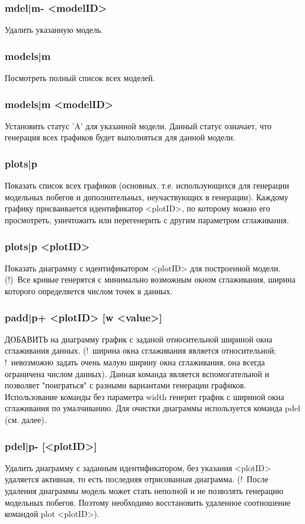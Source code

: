 \documentclass[a4paper]{article}
\begin{document}
\subsubsection{mdel|m- <modelID>}
Удалить указанную модель.

\subsubsection{models|m}
Посмотреть полный список всех моделей.

\subsubsection{models|m <modelID>}
Установить статус 'A' для указанной модели. Данный статус означает, что генерация всех графиков будет выполняться для данной модели.

\subsubsection{plots|p}
Показать список всех графиков (основных, т.е. использующихся для генерации модельных побегов и дополнительных, неучаствующих в генерации). Каждому графику присваивается идентификатор <plotID>, по которому можно его просмотреть, уничтожить или перегенерить с другим параметром сглаживания.

\subsubsection{plots|p <plotID>}
Показать диаграмму с идентификатором <plotID> для построенной модели. (!)~Все кривые генерятся с минимально возможным окном сглаживания, ширина которого определяется числом точек в данных.
 
\subsubsection{padd|p+ <plotID> [w <value>]}
ДОБАВИТЬ на диаграмму график с заданой относительной шириной окна сглаживания данных. (!~ширина окна сглаживания является относительной; !~невозможно задать очень малую ширину окна сглаживания, она всегда ограничена числом данных). Данная команда является вспомогательной и позволяет "поиграться" с разными вариантами генерации графиков.  Использование команды без параметра width генерит график с шириной окна сглаживания по умалчиванию. Для очистки диаграммы используется команда pdel (см. далее). 

\subsubsection{pdel|p- [<plotID>]}
Удалить диаграмму с заданным идентификатором, без указания <plotID> удаляется активная, то есть последняя отрисованная диаграмма. (!~После удаления диаграммы модель может стать неполной и не позволять генерацию модельных побегов. Поэтому необходимо восстановить удаленное соотношение командой plot <plotID>).
\end{document}
